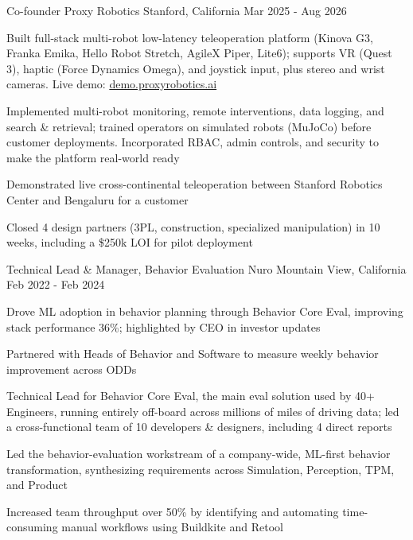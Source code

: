 \begin{cventries}
  \cventry
	{Co-founder} %
	{Proxy Robotics} %
	{Stanford, California} %
	{Mar 2025 - Aug 2026} %
	{
		\begin{cvitems}
		\item {Built full-stack multi-robot low-latency teleoperation platform (Kinova G3, Franka Emika, Hello Robot Stretch, AgileX Piper, Lite6); supports VR (Quest 3), haptic (Force Dynamics Omega), and joystick input, plus stereo and wrist cameras. Live demo: \href{https://demo.proxyrobotics.ai}{\textcolor[HTML]{1A0DAB}{demo.proxyrobotics.ai}}}
		\item {Implemented multi-robot monitoring, remote interventions, data logging, and search \& retrieval; trained operators on simulated robots (MuJoCo) before customer deployments. Incorporated RBAC, admin controls, and security to make the platform real-world ready}
		\item {Demonstrated live cross-continental teleoperation between Stanford Robotics Center and Bengaluru for a customer}
		\item {Closed 4 design partners (3PL, construction, specialized manipulation) in 10 weeks, including a \$250k LOI for pilot deployment}
		\end{cvitems}
	}

  \cventry
	{Technical Lead \& Manager, Behavior Evaluation} %
	{Nuro} %
	{Mountain View, California} %
	{Feb 2022 - Feb 2024} %
	{
		\begin{cvitems}
		\item {Drove ML adoption in behavior planning through Behavior Core Eval, improving stack performance 36\%; highlighted by CEO in investor updates}
		\item {Partnered with Heads of Behavior and Software to measure weekly behavior improvement across ODDs}
		\item {Technical Lead for Behavior Core Eval, the main eval solution used by 40+ Engineers, running entirely off-board across millions of miles of driving data; led a cross-functional team of 10 developers \& designers, including 4 direct reports}
		\item {Led the behavior-evaluation workstream of a company-wide, ML-first behavior transformation, synthesizing requirements across Simulation, Perception, TPM, and Product}
		\item {Increased team throughput over 50\% by identifying and automating time-consuming manual workflows using Buildkite and Retool}
		\end{cvitems}
	}


\end{cventries}
